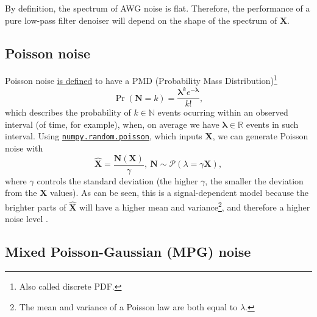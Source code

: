 \documentclass{article}
\begin{document}
By definition, the spectrum of AWG noise is flat. Therefore, the
performance of a pure low-pass filter denoiser will depend on the
shape of the spectrum of $\mathbf{X}$.


\subsection{Poisson noise}

Poisson noise
\href{https://en.wikipedia.org/wiki/Poisson_distribution}{is defined}
to have a PMD (Probability Mass Distribution)\footnote{Also called
  discrete PDF.}
\begin{equation}
  \Pr({\mathbf N}{=}k) = \frac{\mathbf{\lambda}^ke^{-\mathbf{\lambda}}}{k!},
  \label{eq:PN}
\end{equation}
which describes the probability of $k\in\mathbb{N}$ events ocurring
within an observed interval (of time, for example), when, on average
we have ${\mathbf \lambda}\in\mathbb{R}$ events in such
interval. Using
\href{https://numpy.org/doc/stable/reference/random/generated/numpy.random.poisson.html#numpy-random-poisson}{\texttt{numpy.random.poisson}},
which inputs $\mathbf{X}$, we can generate Poisson noise with
\begin{equation}
  \hat{\mathbf{X}} = \frac{\mathbf{N}(\mathbf{X})}{\gamma},~\mathbf{N}\sim\mathcal{P}(\lambda=\gamma\mathbf{X}),
\end{equation}
where $\gamma$ controls the standard deviation (the higher $\gamma$,
the smaller the deviation from the $\mathbf{X}$ values). As can be
seen, this is a signal-dependent model because the brighter parts of
$\hat{\mathbf X}$ will have a higher mean and variance\footnote{The
  mean and variance of a Poisson law are both equal to $\lambda$.},
and therefore a higher noise level \cite{meiniel2018denoising}.


\subsection{Mixed Poisson-Gaussian (MPG) noise}
\end{document}
